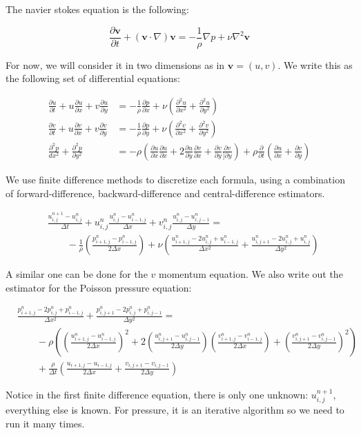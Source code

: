 \documentclass[12pt]{article}
\begin{document}
The navier stokes equation is the following:

\begin{equation}
    \frac{\partial \mathbf{v}}{\partial t} + (\mathbf{v} \cdot \nabla)\mathbf{v} = -\frac{1}{\rho}\nabla p + \nu \nabla^2 \mathbf{v}
\end{equation}

For now, we will consider it in two dimensions as in $\mathbf{v} = (u, v)$. We write this as the following set of differential equations:

\begin{align}
    \frac{\partial u}{\partial t} + u\frac{\partial u}{\partial x} + v\frac{\partial u}{\partial y} &= -\frac{1}{\rho} \frac{\partial p}{\partial x} + \nu(\frac{\partial^2 u}{\partial x^2} + \frac{\partial^2 u}{\partial y^2}) \\
    \frac{\partial v}{\partial t} + u\frac{\partial v}{\partial x} + v\frac{\partial v}{\partial y} &= -\frac{1}{\rho} \frac{\partial p}{\partial y} + \nu(\frac{\partial^2 v}{\partial x^2} + \frac{\partial^2 v}{\partial y^2}) \\
    \frac{\partial^2 p}{dx^2} + \frac{\partial^2 p}{\partial y^2} &= -\rho(\frac{\partial u}{\partial x}\frac{\partial u}{\partial x} + 2\frac{\partial u}{\partial y}\frac{\partial v}{\partial x} + \frac{\partial v}{\partial y}\frac{\partial v}{]\partial y}) + \rho \frac{\partial}{\partial t}(\frac{\partial u}{\partial x} + \frac{\partial v}{\partial y})
\end{align}

We use finite difference methods to discretize each formula, using a combination of forward-difference, backward-difference and central-difference estimators.

\begin{align}
    &\frac{u_{i,j}^{n+1} - u_{i,j}^n}{\Delta t} + u_{i,j}^n\frac{u_{i,j}^n - u_{i-1,j}^n}{\Delta x} + v_{i,j}^n\frac{u_{i,j}^n - u_{i,j-1}^n}{\Delta y} = \\ &\qquad -\frac{1}{\rho}(\frac{p_{i+1,j}^n - p_{i-1,j}^n}{2\Delta x}) + \nu(\frac{u_{i+1,j}^n - 2u_{i,j}^n + u_{i-1,j}^n}{\Delta x^2} + \frac{u_{i,j+1}^n - 2u_{i,j}^n + u_{i,j}^n}{\Delta y^2})
\end{align}

A similar one can be done for the $v$ momentum equation. We also write out the estimator for the Poisson pressure equation:

\begin{align}
    &\frac{p_{i+1,j}^n - 2p_{i,j}^n + p_{i-1,j}^n}{\Delta x^2} + \frac{p_{i,j+1}^n - 2p_{i,j}^n + p_{i,j-1}^n}{\Delta y^2} = \\
    &\qquad -\rho((\frac{u_{i+1,j}^n - u_{i-1,j}^n}{2\Delta x})^2 + 2(\frac{u_{i,j+1}^n - u_{i,j-1}^n}{2\Delta y})(\frac{v_{i+1,j}^n - v_{i-1,j}^n}{2\Delta x}) + (\frac{v_{i,j+1}^n - v_{i,j-1}^n}{2\Delta y})^2) \\
    &\qquad + \frac{\rho}{\Delta t}(\frac{u_{i+1,j} - u_{i-1,j}}{2\Delta x} + \frac{v_{i,j+1} - v_{i,j-1}}{2\Delta y})
\end{align}

Notice in the first finite difference equation, there is only one unknown: $u_{i,j}^{n+1}$, everything else is known. For pressure, it is an iterative algorithm so we need to run it many times.
\end{document}
